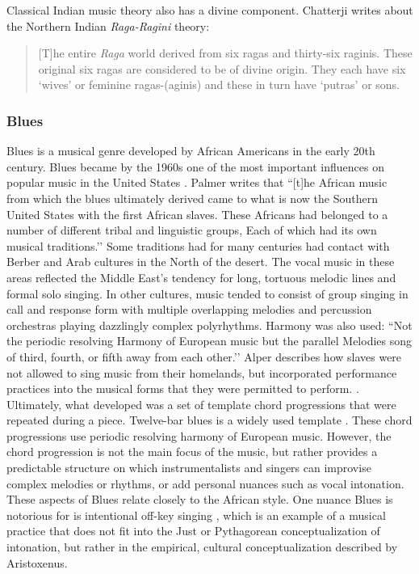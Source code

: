 Classical Indian music theory also has a divine component. Chatterji writes about the Northern Indian \textit{Raga-Ragini} theory:\begin{quotation}[T]he entire \textit{Raga} world derived from six ragas and thirty-six raginis. These original six ragas are considered to be of divine origin. They each have six `wives’ or feminine ragas-(aginis) and these in turn have `putras’ or sons. \parencite[][p.~362]{chatterji1958indian}\end{quotation}

\subsubsection{Blues}
Blues is a musical genre developed by African Americans in the early 20th century. Blues became by the 1960s one of the most important influences on popular music in the United States \cite{blues}. Palmer writes that ``[t]he African music from which the blues ultimately derived came to what is now the Southern United States with the first African slaves. These Africans had belonged to a number of different tribal and linguistic groups, Each of which had its own musical traditions.’’ \cite[][p.~25]{palmer1981deep} Some traditions had for many centuries had contact with Berber and Arab cultures in the North of the desert. The vocal music in these areas reflected the Middle East’s tendency for long, tortuous melodic lines and formal solo singing. In other cultures, music tended to consist of group singing in call and response form with multiple overlapping melodies and percussion orchestras playing dazzlingly complex polyrhythms. Harmony was also used: ``Not the periodic resolving Harmony of European music but the parallel Melodies song of third, fourth, or fifth away from each other.’’ \cite[][p.~27]{palmer1981deep} Alper describes how slaves were not allowed to sing music from their homelands, but incorporated performance practices into the musical forms that they were permitted to perform. \cite{alper2005flexibility}. Ultimately, what developed was a set of template chord progressions that were repeated during a piece. Twelve-bar blues is a widely used template \cite{alper2005flexibility}. These chord progressions use periodic resolving harmony of European music. However, the chord progression is not the main focus of the music, but rather provides a predictable structure on which instrumentalists and singers can improvise complex melodies or rhythms, or add personal nuances such as vocal intonation. These aspects of Blues relate closely to the African style. One nuance Blues is notorious for is intentional off-key singing \cite{autotuneBritannica}, which is an example of a musical practice that does not fit into the Just or Pythagorean conceptualization of intonation, but rather in the empirical, cultural conceptualization described by Aristoxenus.

